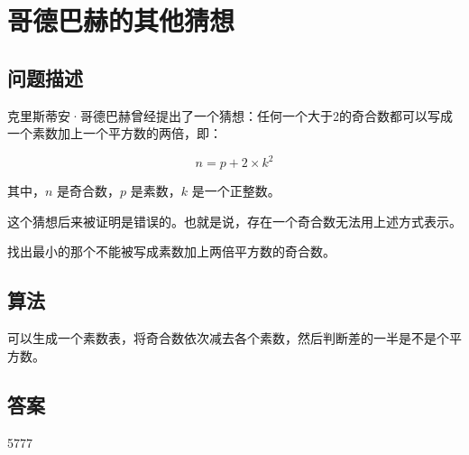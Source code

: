 \section{哥德巴赫的其他猜想}
\subsection{问题描述}
\begin{tcolorbox}
克里斯蒂安·哥德巴赫曾经提出了一个猜想：任何一个大于2的奇合数都可以写成一个素数加上一个平方数的两倍，即：

\[
n = p + 2 \times k^2
\]

其中，\( n \) 是奇合数，\( p \) 是素数，\( k \) 是一个正整数。

这个猜想后来被证明是错误的。也就是说，存在一个奇合数无法用上述方式表示。

找出最小的那个不能被写成素数加上两倍平方数的奇合数。
\end{tcolorbox}

\subsection{算法}
可以生成一个素数表，将奇合数依次减去各个素数，然后判断差的一半是不是个平方数。

\subsection{答案}
5777
